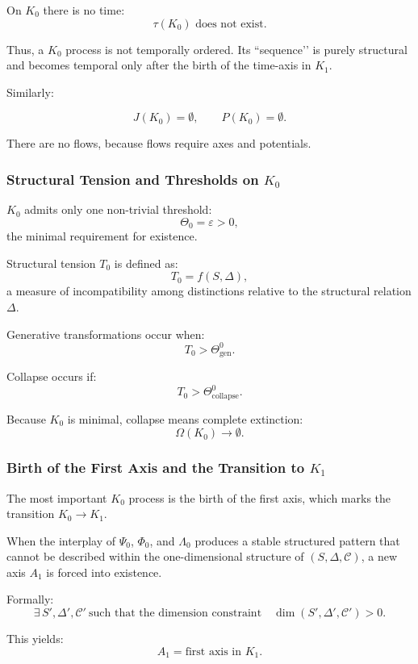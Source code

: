 On $K_0$ there is no time:
\[
\tau(K_0) \text{ does not exist}.
\]

Thus, a $K_0$ process is not temporally ordered.
Its ``sequence’’ is purely structural and becomes temporal only after the
birth of the time-axis in $K_1$.

Similarly:

\[
J(K_0) = \emptyset, \qquad P(K_0) = \emptyset.
\]

There are no flows, because flows require axes and potentials.

\subsubsection{Structural Tension and Thresholds on \texorpdfstring{$K_0$}{K_0}}

$K_0$ admits only one non-trivial threshold:
\[
\Theta_0 = \varepsilon > 0,
\]
the minimal requirement for existence.

Structural tension $T_0$ is defined as:
\[
T_0 = f(S,\Delta),
\]
a measure of incompatibility among distinctions relative to the structural
relation $\Delta$.

Generative transformations occur when:
\[
T_0 > \Theta^0_{\mathrm{gen}}.
\]

Collapse occurs if:
\[
T_0 > \Theta^0_{\mathrm{collapse}}.
\]

Because $K_0$ is minimal, collapse means complete extinction:
\[
\Omega(K_0) \to \emptyset.
\]

\subsubsection{Birth of the First Axis and the Transition to \texorpdfstring{$K_1$}{K_1}}

The most important $K_0$ process is the birth of the first axis, which
marks the transition $K_0 \to K_1$.

When the interplay of $\Psi_0$, $\Phi_0$, and $\Lambda_0$ produces a
stable structured pattern that cannot be described within the
one-dimensional structure of $(S, \Delta, \mathcal{C})$, a new axis $A_1$
is forced into existence.

Formally:
\[
\exists\, S', \Delta', \mathcal{C}'\ \text{such that the dimension constraint}
\quad
\dim(S',\Delta',\mathcal{C}') > 0.
\]

This yields:
\[
A_1 = \text{first axis in } K_1.
\]

